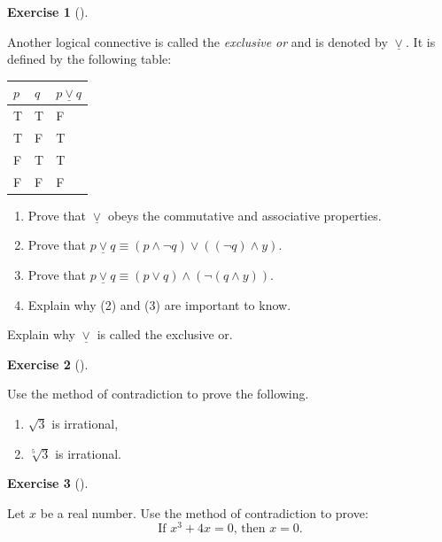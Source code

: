 \documentclass[
  letterpaper,
  10pt,
  reqno,
  twopage,
  openany]{book}
\providecommand{\tightlist}{%
  \setlength{\itemsep}{0pt}\setlength{\parskip}{0pt}}\usepackage{longtable,booktabs,array}
\theoremstyle{plain}
\theoremstyle{definition}
\newtheorem{exercise}{Exercise}[chapter]
\theoremstyle{definition}
\theoremstyle{definition}
\theoremstyle{plain}
\theoremstyle{plain}
\theoremstyle{remark}
\begin{document}
\leavevmode{}%
\begin{exercise}[]\label{exr-exclusive-or}

Another logical connective is called the \emph{exclusive or} and is
denoted by \(\underline{\lor}\). It is defined by the following table:

\begin{longtable}[]{@{}lll@{}}
\toprule()
\(p\) & \(q\) & \(p\underline{\lor} q\) \\
\midrule()
\endhead
T & T & F \\
T & F & T \\
F & T & T \\
F & F & F \\
\bottomrule()
\end{longtable}

\begin{enumerate}
\def\labelenumi{\arabic{enumi}.}
\tightlist
\item
  Prove that \(\underline{\lor}\) obeys the commutative and associative
  properties.
\item
  Prove that
  \(p\underline{\lor}q\equiv (p\land \neg q)\lor ((\neg q)\land y)\).
\item
  Prove that
  \(p\underline{\lor}q\equiv (p\lor q)\land (\neg (q\land y))\).
\item
  Explain why (2) and (3) are important to know.
\end{enumerate}

Explain why \(\underline{\lor}\) is called the exclusive or.

\end{exercise}

\leavevmode{}%
\begin{exercise}[]\label{exr-contradiction-irrational}

Use the method of contradiction to prove the following.

\begin{enumerate}
\def\labelenumi{\arabic{enumi}.}
\tightlist
\item
  \(\sqrt{3}\) is irrational,
\item
  \(\sqrt[5]{3}\) is irrational.
\end{enumerate}

\end{exercise}

\leavevmode{}%
\begin{exercise}[]\label{exr-contradiction-to-prove}

Let \(x\) be a real number. Use the method of contradiction to prove: \[
\text{If $x^3+4x=0$, then $x=0$.} 
\]

\end{exercise}
\end{document}
